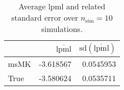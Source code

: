 \begin{table}[H]

\caption{Average lpml and related standard error over $n_{\text{sim}} = 10$ simulations.}
\centering
\begin{tabular}[t]{lrr}
\toprule
  & $\overbar{\text{lpml}}$ & $\text{sd}(\overbar{\text{lpml}})$\\
\midrule
msMK & -3.618567 & 0.0545953\\
True & -3.580624 & 0.0535711\\
\bottomrule
\end{tabular}
\end{table}